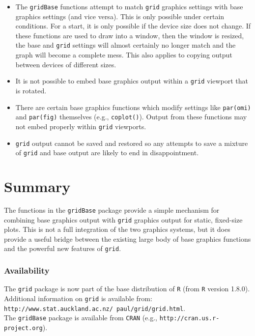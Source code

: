 \documentclass[a4paper]{article}
\newcommand{\grid}{{\tt grid}}
\newcommand{\gridBase}{{\tt gridBase}}
\newcommand{\R}{{\tt R}}
\begin{document}
\begin{itemize}
\item 
The \gridBase{} functions attempt to
match \grid{} graphics settings with base graphics settings (and vice versa). 
 This 
is only possible under certain conditions.  For a start, it is only 
possible if the device size does not change.  If these functions are
used to draw into a window,  then the window is resized, the base and 
\grid{} settings will almost certainly no longer match and the graph
will become a complete mess.  This also applies to copying output between
devices of different sizes.

\item
It is not possible to embed base graphics output within a 
\grid{} viewport that is rotated.

\item
There are certain base graphics functions 
which modify settings
like \verb|par(omi)| and \verb|par(fig)| themselves (e.g., \verb|coplot()|).
  Output from
these functions may not embed properly
within \grid{} viewports.

\item
\grid{} output cannot be
saved and restored so any attempts to save a mixture of \grid{} and
base output are likely
to end in disappointment.

\end{itemize}

\section*{Summary}

The functions in the \gridBase{} package provide a simple mechanism
for combining base graphics output with \grid{} graphics output
for static, fixed-size plots.  This is not a full integration
of the two graphics systems, but it does provide a useful bridge
between the existing large body of base graphics functions and the
powerful new features of \grid{}.


\subsubsection*{Availability}

The \grid{} package is now part of the base distribution of \R{}
(from \R{} version 1.8.0).  \\
Additional information on \grid{}
is available from:\\
 {\tt http://www.stat.auckland.ac.nz/~paul/grid/grid.html}. \\
The \gridBase{} package
is available from \verb|CRAN| (e.g., {\tt http://cran.us.r-project.org}).



\end{document}
